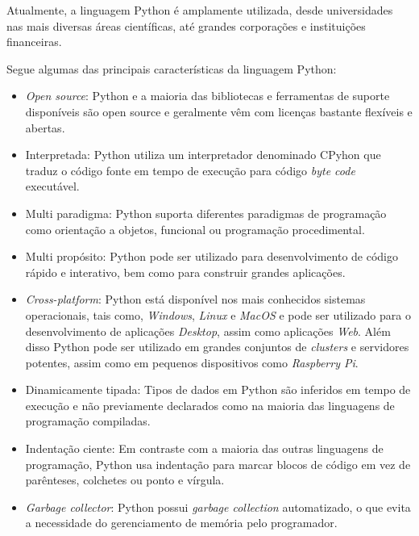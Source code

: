Atualmente, a linguagem Python é amplamente utilizada, desde universidades nas mais diversas áreas científicas, até grandes corporações e instituições financeiras.

Segue algumas das principais características da linguagem Python:

\begin{itemize}

\item \emph{Open source}: Python e a maioria das bibliotecas e ferramentas de suporte disponíveis são
open source e geralmente vêm com licenças bastante flexíveis e abertas.

\item Interpretada: Python utiliza um interpretador denominado CPyhon que traduz o código fonte em tempo de execução para código \emph{byte code} executável.

\item Multi paradigma: Python suporta diferentes paradigmas de programação como orientação a objetos, funcional ou programação procedimental.

\item Multi propósito: Python pode ser utilizado para desenvolvimento de código rápido e interativo, bem como para construir grandes aplicações.

\item \emph{Cross-platform}: Python está disponível nos mais conhecidos sistemas operacionais, tais como, \emph{Windows}, \emph{Linux} e \emph{MacOS} e pode ser utilizado para o desenvolvimento de aplicações \emph{Desktop}, assim como aplicações \emph{Web}. Além disso Python pode ser utilizado em grandes conjuntos de \emph{clusters} e servidores potentes, assim como em pequenos dispositivos como \emph{Raspberry Pi}.

\item Dinamicamente tipada: Tipos de dados em Python são inferidos em tempo de execução e não previamente declarados como na maioria das linguagens de programação compiladas. 

\item Indentação ciente: Em contraste com a maioria das outras linguagens de programação, Python usa indentação para marcar blocos de código em vez de parênteses, colchetes ou ponto e vírgula.

\item \emph{Garbage collector}: Python possui \emph{garbage collection} automatizado, o que evita a necessidade do gerenciamento de memória pelo programador.

\end{itemize}


